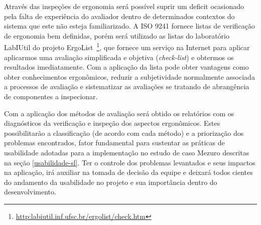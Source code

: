 %
Através das inspeções de ergonomia será possível suprir um deficit ocasionado
pela falta de experiência do avaliador dentro de determinados contextos do
sistema que este não esteja familiarizado.
%
A ISO 9241 fornece listas de verificação de ergonomia bem definidas, porém será
utilizado as listas do laboratório LabIUtil do projeto
ErgoList~\footnote{\url{http:labiutil.inf.ufsc.br/ergolist/check.htm}},
que fornece um serviço na Internet para aplicar aplicarmos uma avaliação
simplificada e objetiva (\textit{check-list}) e obtermos os resultados
imediatamente.
%
Com a aplicação da lista pode obter vantagens como obter conhecimentos
ergonômicos, reduzir a subjetividade normalmente associada a processos de
avaliação e sistematizar as avaliações se tratando de abrangência de componentes
a inspecionar.

Com a aplicação dos métodos de avaliação será obtido os relatórios com os diagnósticos da verificação e inspeção dos aspectos ergonômicos. Estes possibilitarão a classificação (de acordo com cada método) e a priorização dos problemas encontrados, fator fundamental para sustentar as práticas de usabilidade adotadas para a implementação no estudo de caso Mezuro descritas na seção \ref{usabilidade-sl}. Ter o controle dos problemas levantados e seus impactos na aplicação, irá auxiliar na tomada de decisão da equipe e deixará todos cientes do andamento da usabilidade no projeto e sua importância dentro do desenvolvimento. 